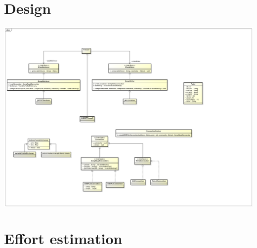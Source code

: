 \documentclass[11pt, a4paper]{article}
\begin{document}
\section{Design}
\includegraphics[width=\textwidth]{images/uml}
 
\section{Effort estimation}
\end{document}
